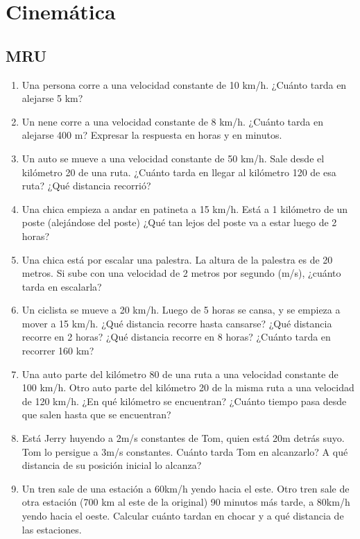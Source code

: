\section{Cinemática}

\subsection{MRU}

\begin{enumerate}

\item Una persona corre a una velocidad constante de 10 km/h. ¿Cuánto tarda en alejarse 5 km? %

\item Un nene corre a una velocidad constante de 8 km/h. ¿Cuánto tarda en alejarse 400 m? Expresar la respuesta en horas y en minutos. %

\item Un auto se mueve a una velocidad constante de 50 km/h. Sale desde el kilómetro 20 de una ruta. ¿Cuánto tarda en llegar al kilómetro 120 de esa ruta? ¿Qué distancia recorrió? %

\item Una chica empieza a andar en patineta a 15 km/h. Está a 1 kilómetro de un poste (alejándose del poste) ¿Qué tan lejos del poste va a estar luego de 2 horas?

\item Una chica está por escalar una palestra. La altura de la palestra es de 20 metros. Si sube con una velocidad de 2 metros por segundo (m/s), ¿cuánto tarda en escalarla?

\item Un ciclista se mueve a 20 km/h. Luego de 5 horas se cansa, y se empieza a mover a 15 km/h. ¿Qué distancia recorre hasta cansarse? ¿Qué distancia recorre en 2 horas? ¿Qué distancia recorre en 8 horas? ¿Cuánto tarda en recorrer 160 km? %

\item Una auto parte del kilómetro 80 de una ruta a una velocidad constante de 100 km/h. Otro auto parte del kilómetro 20 de la misma ruta a una velocidad de 120 km/h. ¿En qué kilómetro se encuentran? ¿Cuánto tiempo pasa desde que salen hasta que se encuentran? %

\item Está Jerry huyendo a 2m/s constantes de Tom, quien está 20m detrás suyo. Tom lo persigue a 3m/s constantes. Cuánto tarda Tom en alcanzarlo? A qué distancia de su posición inicial lo alcanza?

\item Un tren sale de una estación a 60km/h yendo hacia el este. Otro tren sale de otra estación (700 km al este de la original) 90 minutos más tarde, a 80km/h yendo hacia el oeste. Calcular cuánto tardan en chocar y a qué distancia de las estaciones.

\end{enumerate}


